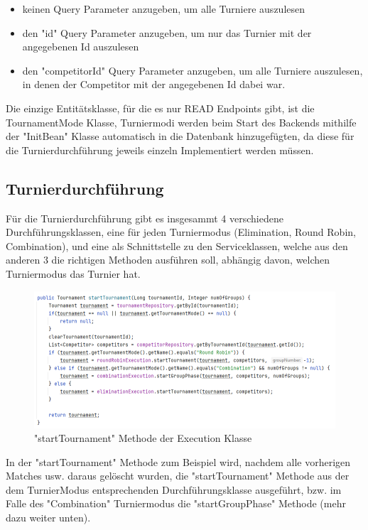 \begin{itemize}
    \item keinen Query Parameter anzugeben, um alle Turniere auszulesen
    \item den "id" Query Parameter anzugeben, um nur das Turnier mit der angegebenen Id auszulesen
    \item den "competitorId" Query Parameter anzugeben, um alle Turniere auszulesen, in denen der Competitor mit der angegebenen Id dabei war.
\end{itemize}

Die einzige Entitätsklasse, für die es nur READ Endpoints gibt, ist die TournamentMode Klasse, Turniermodi werden beim Start des Backends mithilfe der "InitBean" Klasse 
automatisch in die Datenbank hinzugefügten, da diese für die Turnierdurchführung jeweils einzeln Implementiert werden müssen.

\subsection{Turnierdurchführung}

Für die Turnierdurchführung gibt es insgesammt 4 verschiedene Durchführungsklassen, eine für jeden Turniermodus (Elimination, Round Robin, Combination), und eine als Schnittstelle zu den Serviceklassen, welche aus den anderen 3 
die richtigen Methoden ausführen soll, abhängig davon, welchen Turniermodus das Turnier hat. 

\begin{figure}[H]
    \includegraphics[scale=0.65]{pics/backend/execution_startTournament.png}
    \caption{"startTournament" Methode der Execution Klasse}
\end{figure}

In der "startTournament" Methode zum Beispiel wird, nachdem alle vorherigen Matches usw. daraus gelöscht wurden, die "startTournament" Methode aus der dem TurnierModus entsprechenden Durchführungsklasse ausgeführt, 
bzw. im Falle des "Combination" Turniermodus die "startGroupPhase" Methode (mehr dazu weiter unten).

